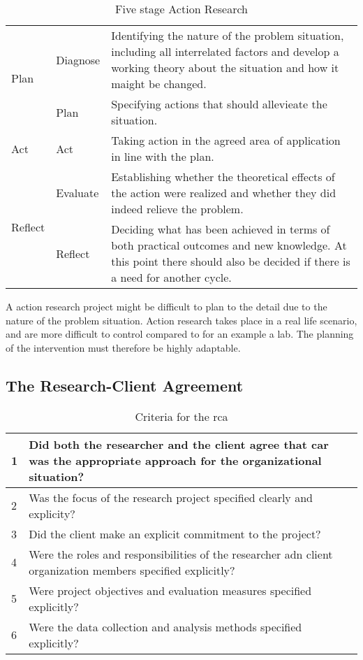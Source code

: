 \begin{table}
\begin{tabular}{p{2cm} p{2cm} p{8cm}}
\hline
\multirow{2}{*}{Plan} & Diagnose & Identifying the nature of the problem situation, including all interrelated factors and develop a working theory about the situation and how it maight be changed.\\
 & Plan & Specifying actions that should allevieate the situation. \\
\hline
Act & Act & Taking action in the agreed area of application in line with the plan.\\
\hline
\multirow{2}{*}{Reflect} & Evaluate & Establishing whether the theoretical effects of the action were realized and whether they did indeed relieve the problem. \\
 & Reflect &  Deciding what has been achieved in terms of both practical outcomes and new knowledge. At this point there should also be decided if there is a need for another cycle. \\
\hline
\end{tabular} 
\caption{Five stage Action Research\cite{bjo:risc}}
\end{table}
A action research project might be difficult to plan to the detail due to the nature of the problem situation. 
Action research takes place in a real life scenario, and are more difficult to control compared to for an example a lab.
The planning of the intervention must therefore be highly adaptable.




\subsection{The Research-Client Agreement}
\begin{table}
\centering
\begin{tabular}{p{2cm} p{6cm}}
\hline
\hline
1 & Did both the researcher and the client agree that \gls{car} was the appropriate approach for the organizational situation? \\\hline
2 & Was the focus of the research project specified clearly and explicity? \\\hline
3 & Did the client make an explicit commitment to the project? \\\hline
4 & Were the roles and responsibilities of the researcher adn client organization members specified explicitly? \\\hline
5 & Were project objectives and evaluation measures specified explicitly? \\\hline
6 & Were the data collection and analysis methods specified explicitly? \\\hline
\hline
\end{tabular}
\caption{Criteria for the \gls{rca}}
\label{tab:rcacriteria}
\end{table}

